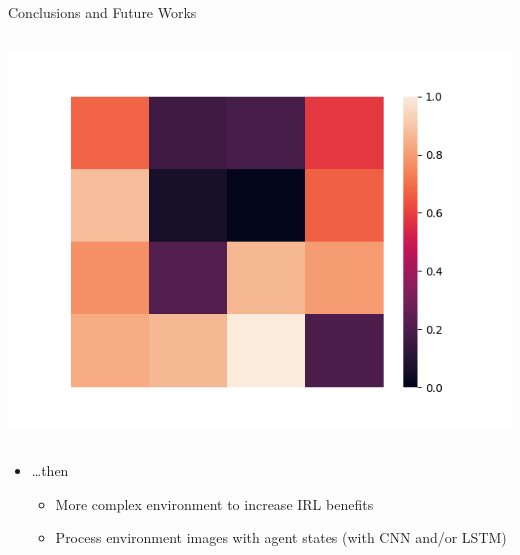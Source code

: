\begin{frame}{Conclusions and Future Works}
\begin{columns}
	
		\begin{column}{0.33\textwidth}
			\includegraphics[width=\linewidth]{images/max_heatmap.png}
		\end{column}
	\end{columns}
	
	
	\begin{itemize}
		\item \ldots then
		\begin{itemize}
			\item More complex environment to increase IRL benefits
			\item Process environment images with agent states (with CNN and/or LSTM)
		\end{itemize}
	\end{itemize}
	
\end{frame}


